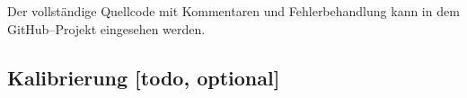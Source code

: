Der vollständige Quellcode mit Kommentaren und Fehlerbehandlung kann in dem GitHub--Projekt \cite{kasdorf2017roslamwithuwb} eingesehen werden.


\begin{comment}
------------------------------------------------------------------------------------------
- Kalibierung nach DecaWave
	- FlowCharts erklären
	- Ergebnisse auswerten
- Wo liegen die Probleme
- Script im Anhang
- Kalibierungsalgorithmus nach decaWave
	- Hab ich den Überhaupt richtig implementiert?
- Kalibierung über die Anpassung der einer Antennen Delay für alle.
- Kann über die Kalibrierung der Antennenverzögerung eine genauere Entfernungsmessung erreicht werden?
- Das Verfahren zur Kalibrierung der Antennenverzögerung kann ebenfalls der Hersteller--Dokumentation entnommen werden, siehe \cite{decawave2014calibration}. Hierfür muss ein Versuchsaufbau erstellt werden. Zusätzlich wird eine Anpassung der Steuer--/Auswerte-Software notwendig, um die Verzögerung zu berechnen.
- Die Genauigkeitsbestimmung der Entfernungsmessung mit LOS und NLOS wird über einen Versuchsaufbau realisiert. Hierfür werden mehrere Messreihen in verschiedenen Abständen aufgenommen und mit der tatsächlichen Entfernung verglichen.
\end{comment}
\subsection{Kalibrierung [todo, optional]}

